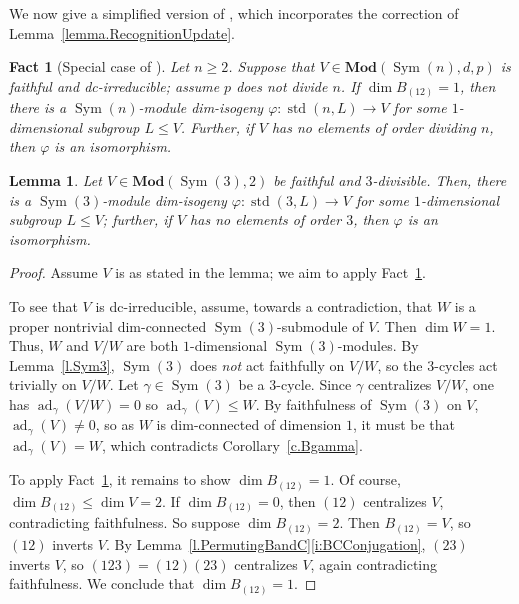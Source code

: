 \documentclass[a4paper, 11pt]{amsart}
\theoremstyle{plain}
\newtheorem{lemma}[theorem]{Lemma}
\newtheorem{fact}[theorem]{Fact}
\theoremstyle{definition}
\theoremstyle{remark}
\DeclareMathOperator{\ad}{ad}
\DeclareMathOperator{\Sym}{Sym}
\DeclareMathOperator{\Alt}{Alt}
\DeclareMathOperator{\std}{std}
\newcommand{\Mod}{\mathbf{Mod}}
\begin{document}
We now give a  simplified version of \cite[Recognition Lemma]{CDW23}, which incorporates the correction of Lemma~\ref{lemma.RecognitionUpdate}.

\begin{fact}[Special case of {\cite[Recognition Lemma]{CDW23}}]\label{fact.Recognition}
Let $n\ge 2$. Suppose that $V \in \Mod (\Sym(n), d, p)$ is faithful and dc-irreducible; assume $p$ does not divide $n$. 
If $\dim B_{(12)} = 1$, then there is a $\Sym(n)$-module dim-isogeny  $\varphi:\std(n,L) \rightarrow V$ for some $1$-dimensional subgroup $L\le V$. Further, if $V$ has no elements of order dividing $n$, then $\varphi$ is an isomorphism.
\end{fact}

\begin{lemma}\label{l.Sym3Recognition}
Let $V\in \Mod(\Sym(3),2)$ be faithful and $3$-divisible. Then, there is a $\Sym(3)$-module dim-isogeny $\varphi:\std(3,L)\rightarrow V$ for some $1$-dimensional subgroup $L\le V$; further, if $V$ has no elements of order $3$, then $\varphi$ is an isomorphism.
\end{lemma}
\begin{proof}
Assume $V$ is as stated in the lemma; we aim to apply Fact~\ref{fact.Recognition}.  

To see that $V$ is dc-irreducible, assume,  towards a contradiction, that $W$ is a proper nontrivial dim-connected $\Sym(3)$-submodule of $V$. Then $\dim W=1$.  %
Thus, $W$ and $V/W$ are both $1$-dimensional $\Sym(3)$-modules. By Lemma~\ref{l.Sym3}, $\Sym(3)$ does \emph{not} act faithfully on $V/W$, so the $3$-cycles act trivially on $V/W$. Let $\gamma\in \Sym(3)$ be a $3$-cycle. Since $\gamma$ centralizes $V/W$, 
one has $\ad_\gamma (V/W) = 0$ so $\ad_\gamma(V) \le W$.
By faithfulness of $\Sym(3)$ on $V$, $\ad_\gamma(V) \neq 0$, so as $W$ is dim-connected of dimension $1$, it must be that $\ad_\gamma(V) = W$, which contradicts Corollary~\ref{c.Bgamma}.

To apply Fact~\ref{fact.Recognition}, it remains to show  $\dim B_{(12)} = 1$. Of course, $\dim B_{(12)} \le \dim V = 2$. If  $\dim B_{(12)} = 0$, then $(12)$ centralizes $V$, contradicting faithfulness. So suppose $\dim B_{(12)} = 2$. Then $B_{(12)} = V$, so $(12)$ inverts $V$. By Lemma~\ref{l.PermutingBandC}\eqref{i:BCConjugation}, $(23)$ inverts $V$, so $(123) = (12)(23)$ centralizes $V$, again contradicting faithfulness. We conclude that $\dim B_{(12)} = 1$.
\end{proof}
\end{document}
